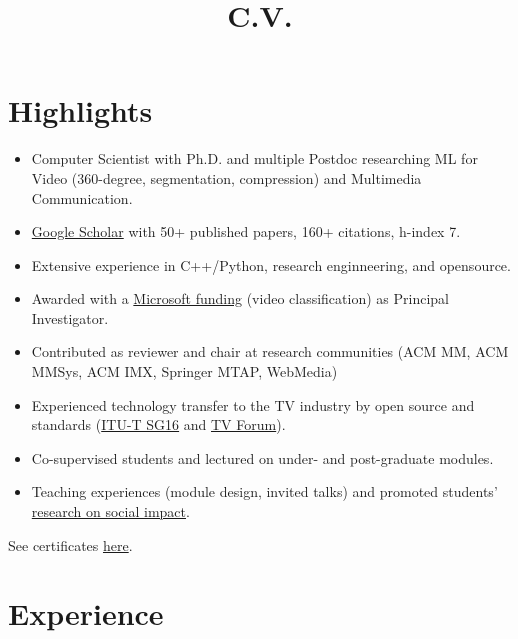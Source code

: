 \documentclass[10pt,a4paper,sans,colorlinks]{moderncv}
\title{C.V.}
\begin{document}
\setHyperrefBlueLinks
\makecvtitle
\vspace{-2em}

\section{Highlights}

\begin{itemize}
    \item Computer Scientist with Ph.D. and multiple Postdoc researching ML for Video (360-degree, segmentation, compression) and Multimedia Communication.
    \item \href{https://scholar.google.com/citations?user=1bEOmkUAAAAJ&hl=en}{Google Scholar} with 50+ published papers, 160+ citations, h-index 7.
    \item Extensive experience in C++/Python, research enginneering, and opensource.    \item Awarded with a \href{https://www.rnp.br/en/rnp-and-microsoft-challenge-artificial-intelligence}{Microsoft funding} (video classification) as Principal Investigator.
    \item Contributed as reviewer and chair at research communities (ACM MM, ACM MMSys, ACM IMX, Springer MTAP, WebMedia)
    \item Experienced technology transfer to the TV industry by open source and standards (\href{http://www.itu.int/en/ITU-T/studygroups/2022-2024/16}{ITU-T SG16} and \href{http://forumsbtvd.org.br}{TV Forum}).
    \item Co-supervised students and lectured on under- and post-graduate modules.
    \item Teaching experiences (module design, invited talks) and promoted students' \href{https://webmedia.org.br/2022/en/lf-award/}{research on social impact}.
\end{itemize}

See certificates \href{https://alanlivio.github.io/certificates.pdf}{here}.

\section{Experience}
\end{document}
